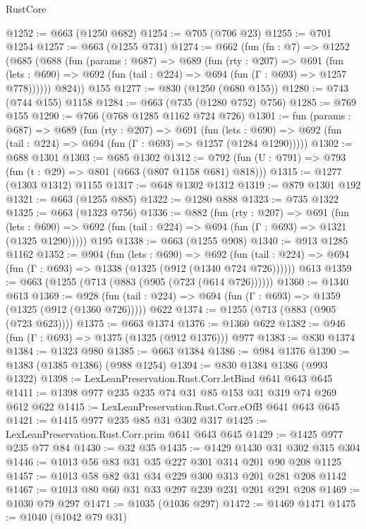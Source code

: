 \begin{lexlean}{RustCore}
\begin{coremodule}
@1252 := @663 (@1250 @682)
@1254 := @705 (@706 @23)
@1255 := @701 @1254
@1257 := @663 (@1255 @731)
@1274 := @662
    (fun (fn : @7) =>
    @1252
      (@685
        (@688
          (fun (params : @687) =>
          @689
            (fun (rty : @207) =>
            @691
              (fun (lets : @690) =>
              @692 (fun (tail : @224) => @694 (fun (Γ : @693) => @1257 @778))))))
        @824))
    @155
@1277 := @830 (@1250 (@680 @155))
@1280 := @743 (@744 @155) @1158
@1284 := @663 (@735 (@1280 @752) @756)
@1285 := @769 @155
@1290 := @766 (@768 @1285 @1162 @724 @726)
@1301 := fun (params : @687) =>
  @689
    (fun (rty : @207) =>
    @691
      (fun (lets : @690) =>
      @692 (fun (tail : @224) => @694 (fun (Γ : @693) => @1257 (@1284 @1290)))))
@1302 := @688 @1301
@1303 := @685 @1302
@1312 := @792 (fun (U : @791) => @793 (fun (t : @29) => @801 (@663 (@807 @1158 @681) @818)))
@1315 := @1277 (@1303 @1312) @1155
@1317 := @648 @1302 @1312
@1319 := @879 @1301 @192
@1321 := @663 (@1255 @885)
@1322 := @1280 @888
@1323 := @735 @1322
@1325 := @663 (@1323 @756)
@1336 := @882
    (fun (rty : @207) =>
    @691
      (fun (lets : @690) =>
      @692 (fun (tail : @224) => @694 (fun (Γ : @693) => @1321 (@1325 @1290)))))
    @195
@1338 := @663 (@1255 @908)
@1340 := @913 @1285 @1162
@1352 := @904
    (fun (lets : @690) =>
    @692 (fun (tail : @224) => @694 (fun (Γ : @693) => @1338 (@1325 (@912 (@1340 @724 @726))))))
    @613
@1359 := @663 (@1255 (@713 (@883 (@905 (@723 (@614 @726))))))
@1360 := @1340 @613
@1369 := @928 (fun (tail : @224) => @694 (fun (Γ : @693) => @1359 (@1325 (@912 (@1360 @726))))) @622
@1374 := @1255 (@713 (@883 (@905 (@723 @623))))
@1375 := @663 @1374
@1376 := @1360 @622
@1382 := @946 (fun (Γ : @693) => @1375 (@1325 (@912 @1376))) @977
@1383 := @830 @1374
@1384 := @1323 @980
@1385 := @663 @1384
@1386 := @984 @1376
@1390 := @1383 (@1385 @1386) (@988 @1254)
@1394 := @830 @1384 @1386 (@993 @1322)
@1398 := LexLeanPreservation.Rust.Corr.letBind @641 @643 @645
@1411 := @1398 @977 @235 @235 @74 @31 @85 @153 @31 @319 @74 @269 @612 @622
@1415 := LexLeanPreservation.Rust.Corr.eOfB @641 @643 @645
@1421 := @1415 @977 @235 @85 @31 @302 @317
@1425 := LexLeanPreservation.Rust.Corr.prim @641 @643 @645
@1429 := @1425 @977 @235 @77 @84
@1430 := @32 @35
@1435 := @1429 @1430 @31 @302 @315 @304
@1446 := @1013 @56 @83 @31 @35 @227 @301 @314 @201 @90 @208 @1125
@1457 := @1013 @58 @82 @31 @34 @229 @300 @313 @201 @281 @208 @1142
@1467 := @1013 @80 @60 @31 @33 @297 @239 @231 @201 @291 @208
@1469 := @1030 @79 @297
@1471 := @1035 (@1036 @297)
@1472 := @1469 @1471
@1475 := @1040 (@1042 @79 @31)

\end{coremodule}
\end{lexlean}
